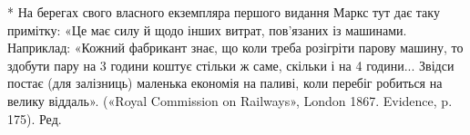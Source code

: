 * На берегах свого власного екземпляра першого видання Маркс
тут дає таку примітку: «Це має силу й щодо інших витрат, пов’язаних із
машинами. Наприклад: «Кожний фабрикант знає, що коли треба розігріти
парову машину, то здобути пару на 3 години коштує стільки ж саме,
скільки і на 4 години... Звідси постає (для залізниць) маленька економія
на паливі, коли перебіг робиться на велику віддаль». («Royal Commission
on Railways», London 1867. Evidence, p. 175). Ред.
